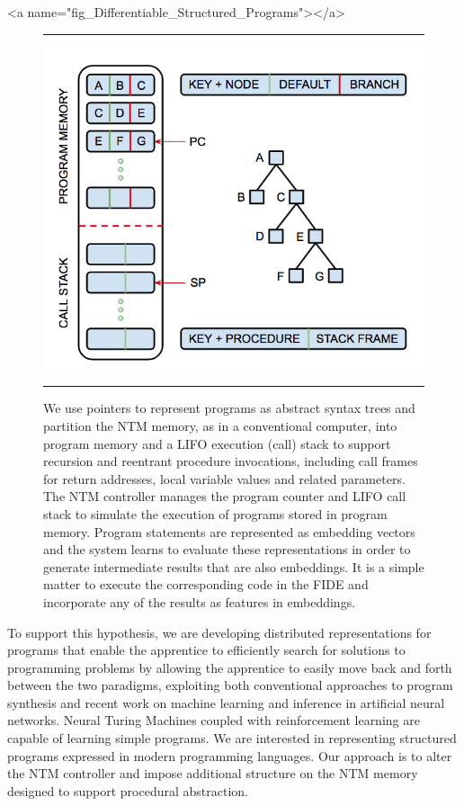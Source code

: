 \setcounter{figure}{53}


\rawhtml
<a name="fig_Differentiable_Structured_Programs"></a>
\endrawhtml
\begin{figure}
%
  \hrule{}
%
  \begin{center} 
    \includegraphics[width=325pt]{./figures/Differentiable_Structured_Programs.png} %
  \end{center}
%
  \caption{We use pointers to represent programs as abstract syntax trees and partition the NTM memory, as in a conventional computer, into program memory and a LIFO execution (call) stack to support recursion and reentrant procedure invocations, including call frames for return addresses, local variable values and related parameters. The NTM controller manages the program counter and LIFO call stack to simulate the execution of programs stored in program memory. Program statements are represented as embedding vectors and the system learns to evaluate these representations in order to generate intermediate results that are also embeddings. It is a simple matter to execute the corresponding code in the FIDE and incorporate any of the results as features in embeddings.}
%
  \hrule{}
%
\end{figure}


To support this hypothesis, we are developing distributed representations for programs that enable the apprentice to efficiently search for solutions to programming problems by allowing the apprentice to easily move back and forth between the two paradigms, exploiting both conventional approaches to program synthesis and recent work on machine learning and inference in artificial neural networks. Neural Turing Machines coupled with reinforcement learning are capable of learning simple programs. We are interested in representing structured programs expressed in modern programming languages. Our approach is to alter the NTM controller and impose additional structure on the NTM memory designed to support procedural abstraction. 

